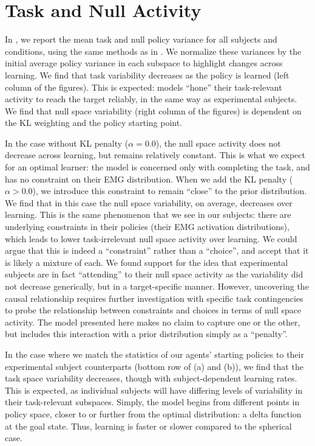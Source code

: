 \documentclass[../main.tex]{subfiles}
\begin{document}
\section{Task and Null Activity}

In , we report the mean task and null policy variance for all subjects and conditions, using the same methods as in . We normalize these variances by the initial average policy variance in each subspace to highlight changes across learning. We find that task variability decreases as the policy is learned (left column of the figures). This is expected: models ``hone'' their task-relevant activity to reach the target reliably, in the same way as experimental subjects. We find that null space variability (right column of the figures) is dependent on the KL weighting and the policy starting point.

In the case without KL penalty ($\alpha=0.0$), the null space activity does not decrease across learning, but remains relatively constant. This is what we expect for an optimal learner: the model is concerned only with completing the task, and has no constraint on their EMG distribution. When we add the KL penalty ($\alpha>0.0$), we introduce this constraint to remain ``close'' to the prior distribution. We find that in this case the null space variability, on average, decreases over learning. This is the same phenomenon that we see in our subjects: there are underlying constraints in their policies (their EMG activation distributions), which leads to lower task-irrelevant null space activity over learning. We could argue that this is indeed a ``constraint'' rather than a ``choice'', and accept that it is likely a mixture of each. We found support for the idea that experimental subjects are in fact ``attending'' to their null space activity as the variability did not decrease generically, but in a target-specific manner. However, uncovering the causal relationship requires further investigation with specific task contingencies to probe the relationship between constraints and choices in terms of null space activity. The model presented here makes no claim to capture one or the other, but includes this interaction with a prior distribution simply as a ``penalty''.

In the case where we match the statistics of our agents' starting policies to their experimental subject counterparts (bottom row of  (a) and (b)), we find that the task space variability decreases, though with subject-dependent learning rates. This is expected, as individual subjects will have differing levels of variability in their task-relevant subspaces. Simply, the model begins from different points in policy space, closer to or further from the optimal distribution: a delta function at the goal state. Thus, learning is faster or slower compared to the spherical case. 
\end{document}
